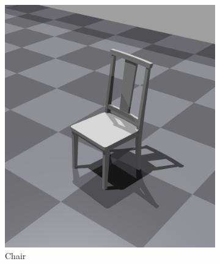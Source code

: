 \begin{figure}[H]
\begin{subfigure}[b]{0.3\textwidth}
         \includegraphics[width=\textwidth]{figures/6_/chair.png}
         \caption{Chair}
         \label{fig:6_obst_chair}
     \end{subfigure}
     \hfill \\[2mm]
     \hspace{0.04\textwidth}
     \begin{subfigure}[b]{0.3\textwidth}
         \centering
         \captionsetup{justification=centering}

\end{subfigure}
\end{figure}
